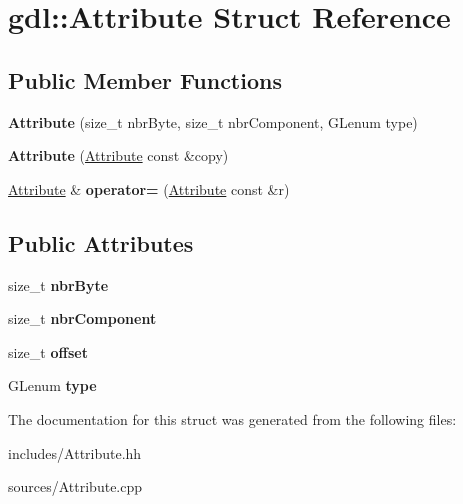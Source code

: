 \hypertarget{structgdl_1_1_attribute}{\section{gdl\-:\-:Attribute Struct Reference}
\label{structgdl_1_1_attribute}
}
\subsection*{Public Member Functions}
\begin{DoxyCompactItemize}
\item 
\hypertarget{structgdl_1_1_attribute_a50d4d3c9a0424c684a2c2b4745fbb2b4}{{\bfseries Attribute} (size\-\_\-t nbr\-Byte, size\-\_\-t nbr\-Component, G\-Lenum type)}\label{structgdl_1_1_attribute_a50d4d3c9a0424c684a2c2b4745fbb2b4}

\item 
\hypertarget{structgdl_1_1_attribute_ac79d60cd54c3e93193aea1c94dcba4ef}{{\bfseries Attribute} (\hyperlink{structgdl_1_1_attribute}{Attribute} const \&copy)}\label{structgdl_1_1_attribute_ac79d60cd54c3e93193aea1c94dcba4ef}

\item 
\hypertarget{structgdl_1_1_attribute_a8afdeeebea200c439e38ee614e07be17}{\hyperlink{structgdl_1_1_attribute}{Attribute} \& {\bfseries operator=} (\hyperlink{structgdl_1_1_attribute}{Attribute} const \&r)}\label{structgdl_1_1_attribute_a8afdeeebea200c439e38ee614e07be17}

\end{DoxyCompactItemize}
\subsection*{Public Attributes}
\begin{DoxyCompactItemize}
\item 
\hypertarget{structgdl_1_1_attribute_a70cb7692817d55628bf9d909d75f1f53}{size\-\_\-t {\bfseries nbr\-Byte}}\label{structgdl_1_1_attribute_a70cb7692817d55628bf9d909d75f1f53}

\item 
\hypertarget{structgdl_1_1_attribute_a6b584e52c6cefe965fb9a396917e0729}{size\-\_\-t {\bfseries nbr\-Component}}\label{structgdl_1_1_attribute_a6b584e52c6cefe965fb9a396917e0729}

\item 
\hypertarget{structgdl_1_1_attribute_aabcc64acb6a51b2e5508a6ff9b14b506}{size\-\_\-t {\bfseries offset}}\label{structgdl_1_1_attribute_aabcc64acb6a51b2e5508a6ff9b14b506}

\item 
\hypertarget{structgdl_1_1_attribute_a633e64f1e8e4b3dede7c23d2627896a3}{G\-Lenum {\bfseries type}}\label{structgdl_1_1_attribute_a633e64f1e8e4b3dede7c23d2627896a3}

\end{DoxyCompactItemize}


The documentation for this struct was generated from the following files\-:\begin{DoxyCompactItemize}
\item 
includes/Attribute.\-hh\item 
sources/Attribute.\-cpp\end{DoxyCompactItemize}
